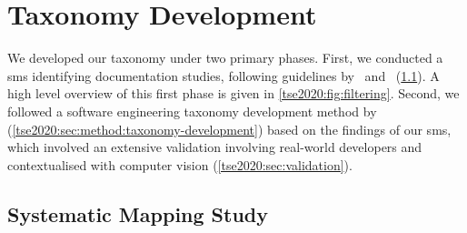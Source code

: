 \section{Taxonomy Development}
\label{tse2020:sec:method}

We developed our taxonomy under two primary phases. First, we conducted a \gls{sms} identifying  documentation studies, following guidelines by~\citet{Kitchenham:2007dd} and~\citet{Petersen:2008td} (\cref{tse2020:sec:method:lit-review}). A high level overview of this first phase is given in \cref{tse2020:fig:filtering}. Second, we followed a software engineering taxonomy development method by~\citet{Usman:2017hn} (\cref{tse2020:sec:method:taxonomy-development}) based on the findings of our \gls{sms}, which involved an extensive validation involving real-world developers and contextualised with computer vision  (\cref{tse2020:sec:validation}).

\subsection{Systematic Mapping Study}
\label{tse2020:sec:method:lit-review}


